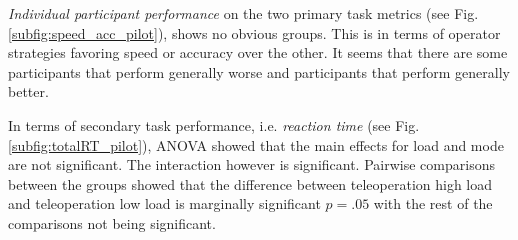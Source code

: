 \documentclass[a4paper,12pt,oneside,openright]{bhamthesis}
\begin{document}
\textit{Individual participant performance} on the two primary task metrics (see Fig. \ref{subfig:speed_acc_pilot}), shows no obvious groups. This is in terms of operator strategies favoring speed or accuracy over the other. It seems that there are some participants that perform generally worse and participants that perform generally better.

In terms of secondary task performance, i.e. \textit{reaction time} (see Fig. \ref{subfig:totalRT_pilot}), ANOVA showed that the main effects for load and mode are not significant. The interaction however is significant. Pairwise comparisons between the groups showed that the difference between teleoperation high load and teleoperation low load is marginally significant \textit{$p =.05$} with the rest of the comparisons not being significant.
\end{document}
